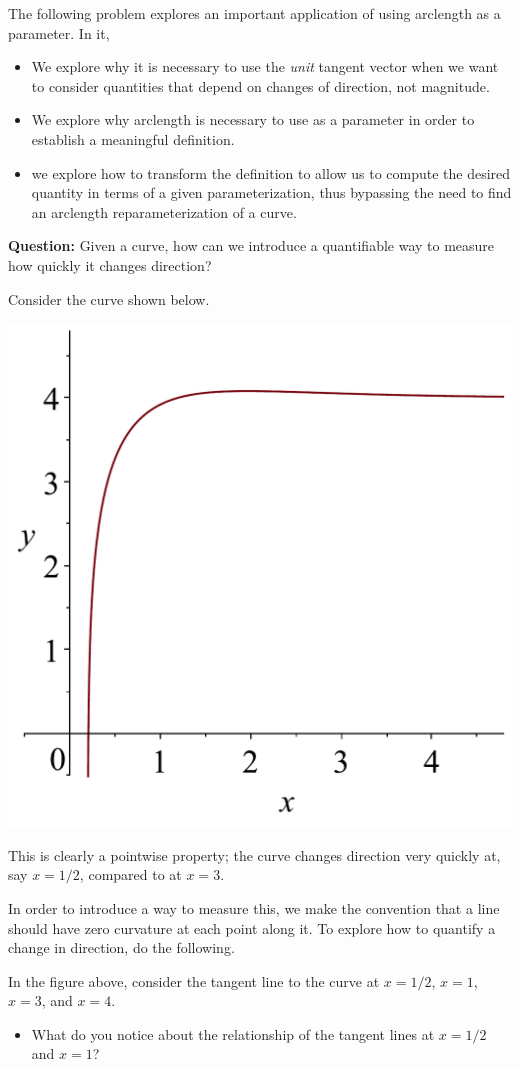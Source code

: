 \documentclass{ximera}
\author{Jim Talamo}
\begin{document}
\begin{exercise}
 
The following problem explores an important application of using arclength as a parameter.  In it, 

\begin{itemize}
\item We explore why it is necessary to use the \emph{unit} tangent vector when we want to consider quantities that depend on changes of direction, not magnitude.
\item We explore why arclength is necessary to use as a parameter in order to establish a meaningful definition. 
\item we explore how to transform the definition to allow us to compute the desired quantity in terms of a given parameterization, thus bypassing the need to find an arclength reparameterization of a curve.
\end{itemize}

\textbf{Question:} Given a curve, how can we introduce a quantifiable way to measure how quickly it changes direction?

Consider the curve shown below.  

\begin{image}
  \includegraphics[width=.35 \textwidth]{Curv1.pdf}
\end{image}

This is clearly a pointwise property;  the curve changes direction very quickly at, say $x=1/2$, compared to at $x=3$.

In order to introduce a way to measure this, we make the convention that a line should have zero curvature at each point along it.  To explore how to quantify a change in direction, do the following.


In the figure above, consider the tangent line to the curve at $x=1/2$, $x=1$, $x=3$, and $x=4$.  

\begin{itemize}
\item What do you notice about the relationship of the tangent lines at $x=1/2$ and $x=1$?  


\end{itemize}
\end{exercise}
\end{document}
